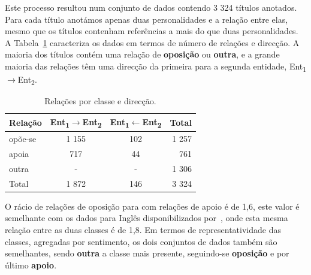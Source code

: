 \documentclass[a4paper, twocolumn, 11pt, twoside]{article}
\begin{document}
Este processo resultou num conjunto de dados contendo 3 324 títulos anotados. Para cada título anotámos apenas duas personalidades e a relação entre elas, mesmo que os títulos contenham referências a mais do que duas personalidades. A Tabela~\ref{tab:rel_dataset} caracteriza os dados em termos de número de relações e direcção. A maioria dos títulos contém uma relação de \textbf{oposição} ou \textbf{outra}, e a grande maioria das relações têm uma direcção da primeira para a segunda entidade, Ent\textsubscript{1}$\rightarrow$Ent\textsubscript{2}.


\begin{table}[!h]
    \begin{center}
    \begin{tabular}{l ccr}
        {\bf Relação} & {\bf \footnotesize{Ent\textsubscript{1}$\rightarrow$Ent\textsubscript{2}}} & {\bf \footnotesize{Ent\textsubscript{1}$\leftarrow$Ent\textsubscript{2}}} & {\bf Total} \\
        \hline
        opõe-se          &  1 155  &  102  &  1 257  \\
        apoia            &    717  &   44  &    761  \\
        outra            &    -    &   -   &  1 306  \\
		\hline
		Total			 &  1 872  &  146  &  3 324  \\
    \end{tabular}
	\caption{Relações por classe e direcção.}
	\label{tab:rel_dataset}
	\end{center}
\end{table}

O rácio de relações de oposição para com relações de apoio é de 1,6, este valor é semelhante com os dados para Inglês disponibilizados por~\cite{park-etal-2021-blames}, onde esta mesma relação entre as duas classes é de 1,8.  Em termos de representatividade das classes, agregadas por sentimento, os dois conjuntos de dados também são semelhantes, sendo \textbf{outra} a classe mais presente, seguindo-se \textbf{oposição} e por último \textbf{apoio}.


\end{document}
